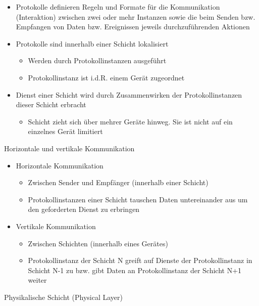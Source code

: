     \begin{itemize}
      \item Protokolle definieren Regeln und Formate für die Kommunikation (Interaktion) zwischen zwei
        oder mehr Instanzen sowie die beim Senden bzw. Empfangen von Daten bzw. Ereignissen jeweils
        durchzuführenden Aktionen
      \item Protokolle sind innerhalb einer Schicht lokalisiert
        \begin{itemize}
          \item Werden durch Protokollinstanzen ausgeführt
          \item Protokollinstanz ist i.d.R. einem Gerät zugeordnet
        \end{itemize}
      \item Dienst einer Schicht wird durch Zusammenwirken der Protokollinstanzen dieser Schicht
        erbracht
        \begin{itemize}
          \item Schicht zieht sich über mehrer Geräte hinweg. Sie ist nicht auf ein einzelnes Gerät
            limitiert
        \end{itemize}
    \end{itemize}
    Horizontale und vertikale Kommunikation
    \begin{itemize}
      \item Horizontale Kommunikation
        \begin{itemize}
          \item Zwischen Sender und Empfänger (innerhalb einer Schicht)
          \item Protokollinstanzen einer Schicht tauschen Daten untereinander aus um den geforderten
            Dienst zu erbringen
        \end{itemize}
      \item Vertikale Kommunikation
        \begin{itemize}
          \item Zwischen Schichten (innerhalb eines Gerätes)
          \item Protokollinstanz der Schicht N greift auf Dienste der Protokollinstanz in Schicht
            N-1 zu bzw. gibt Daten an Protokollinstanz der Schicht N+1 weiter
        \end{itemize}
    \end{itemize}
    Physikalische Schicht (Physical Layer)
